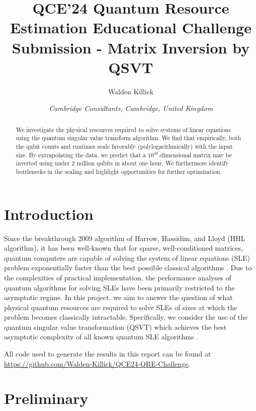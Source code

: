 \documentclass[10pt, twocolumn]{article}
\begin{document}
\title{QCE'24 Quantum Resource Estimation Educational Challenge Submission - Matrix Inversion by QSVT}
\author{Walden Killick}
\date{\textit{Cambridge Consultants, Cambridge, United Kingdom}}

\maketitle

\begin{abstract}
	We investigate the physical resources required to solve systems of linear equations using the quantum singular value transform algorithm. We find that empirically, both the qubit counts and runtimes scale favorably (polylogarithmically) with the input size. By extrapolating the data, we predict that a $10^{10}$-dimensional matrix may be inverted using under 2 million qubits in about one hour. We furthermore identify bottlenecks in the scaling and highlight opportunities for further optimization.
\end{abstract}

\section{Introduction}

Since the breakthrough 2009 algorithm of Harrow, Hassidim, and Lloyd (HHL algorithm), it has been well-known that for sparse, well-conditioned matrices, quantum computers are capable of solving the system of linear equations (SLE) problem exponentially faster than the best possible classical algorithms \cite{harrow2009quantum}. Due to the complexities of practical implementation, the performance analyses of quantum algorithms for solving SLEs have been primarily restricted to the asymptotic regime. In this project, we aim to answer the question of what physical quantum resources are required to solve SLEs of sizes at which the problem becomes classically intractable. Specifically, we consider the use of the quantum singular value transformation (QSVT) which achieves the best asymptotic complexity of all known quantum SLE algorithms \cite{gilyen2019quantum, martyn2021grand}.

All code used to generate the results in this report can  be found at \href{https://github.com/Walden-Killick/QCE24-QRE-Challenge}{https://github.com/Walden-Killick/QCE24-QRE-Challenge}.

\section{Preliminary}
\end{document}
